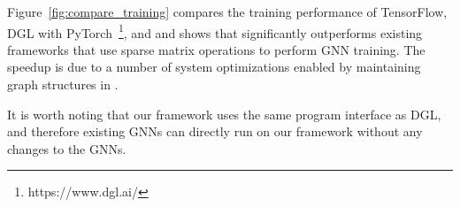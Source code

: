 Figure~\ref{fig:compare_training} compares the training performance of TensorFlow, DGL with PyTorch~\footnote{https://www.dgl.ai/}, and \sys and shows that \sys significantly outperforms existing frameworks that use sparse matrix operations to perform GNN training.
The speedup is due to a number of system optimizations enabled by maintaining graph structures in \sys.

It is worth noting that our framework uses the same program interface as DGL, and therefore existing GNNs can directly run on our framework without any changes to the GNNs.

